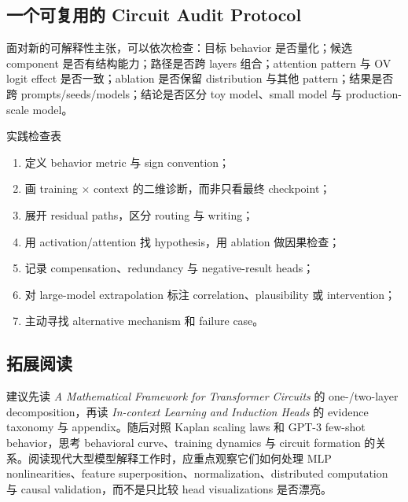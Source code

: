 \subsection{一个可复用的 Circuit Audit Protocol}

面对新的可解释性主张，可以依次检查：目标 behavior 是否量化；候选 component 是否有结构能力；路径是否跨 layers 组合；attention pattern 与 OV logit effect 是否一致；ablation 是否保留 distribution 与其他 pattern；结果是否跨 prompts/seeds/models；结论是否区分 toy model、small model 与 production-scale model。

\begin{knowledgebox}{实践检查表}
\begin{enumerate}
  \item 定义 behavior metric 与 sign convention；
  \item 画 training × context 的二维诊断，而非只看最终 checkpoint；
  \item 展开 residual paths，区分 routing 与 writing；
  \item 用 activation/attention 找 hypothesis，用 ablation 做因果检查；
  \item 记录 compensation、redundancy 与 negative-result heads；
  \item 对 large-model extrapolation 标注 correlation、plausibility 或 intervention；
  \item 主动寻找 alternative mechanism 和 failure case。
\end{enumerate}
\end{knowledgebox}

\subsection{拓展阅读}

建议先读 \emph{A Mathematical Framework for Transformer Circuits} 的 one-/two-layer decomposition，再读 \emph{In-context Learning and Induction Heads} 的 evidence taxonomy 与 appendix。随后对照 Kaplan scaling laws 和 GPT-3 few-shot behavior，思考 behavioral curve、training dynamics 与 circuit formation 的关系。阅读现代大型模型解释工作时，应重点观察它们如何处理 MLP nonlinearities、feature superposition、normalization、distributed computation 与 causal validation，而不是只比较 head visualizations 是否漂亮。



